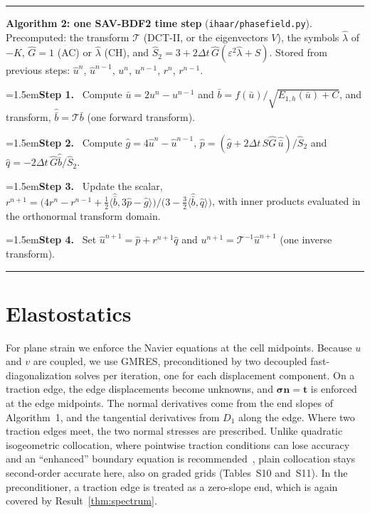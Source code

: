 \documentclass[preprint,12pt]{elsarticle}
\theoremstyle{remark}
\newcommand{\step}[1]{\par\noindent\hangindent=1.5em\hangafter=1\textbf{Step #1.}\ }
\begin{document}
\begin{algorithm}[t]\small\hrule\smallskip
\noindent\textbf{Algorithm 2: one SAV-BDF2 time step} (\texttt{ihaar/phasefield.py}).
Precomputed: the transform $\mathcal T$ (DCT-II, or the eigenvectors $V$), the symbols $\hat\lambda$ of
$-K$, $\hat G=1$ (AC) or $\hat\lambda$ (CH), and $\hat S_2=3+2\Delta t\,\hat G(\varepsilon^2\hat\lambda+S)$.
Stored from previous steps: $\hat u^n$, $\hat u^{n-1}$, $u^n$, $u^{n-1}$, $r^n$, $r^{n-1}$.
\step{1} Compute $\bar u=2u^n-u^{n-1}$ and $\bar b=f(\bar u)/\sqrt{E_{1,h}(\bar u)+C}$, and transform, $\hat{\bar b}=\mathcal T\bar b$ (one forward transform).
\step{2} Compute $\hat g=4\hat u^n-\hat u^{n-1}$, $\hat p=(\hat g+2\Delta t\,S\hat G\,\hat{\bar u})/\hat S_2$ and $\hat q=-2\Delta t\,\hat G\hat{\bar b}/\hat S_2$.
\step{3} Update the scalar, $r^{n+1}=\big(4r^n-r^{n-1}+\tfrac12\langle\hat{\bar b},3\hat p-\hat g\rangle\big)/\big(3-\tfrac32\langle\hat{\bar b},\hat q\rangle\big)$, with inner products evaluated in the orthonormal transform domain.
\step{4} Set $\hat u^{n+1}=\hat p+r^{n+1}\hat q$ and $u^{n+1}=\mathcal T^{-1}\hat u^{n+1}$ (one inverse transform).
\smallskip\hrule
\end{algorithm}

\section{Elastostatics}\label{sec:elast}
For plane strain we enforce the Navier equations at the cell midpoints. Because $u$ and $v$ are coupled,
we use GMRES, preconditioned by two decoupled fast-diagonalization solves per iteration, one for each
displacement component. On a traction edge, the edge displacements become unknowns, and
$\boldsymbol\sigma\mathbf n=\mathbf t$ is enforced at the edge midpoints. The normal derivatives come from
the end slopes of Algorithm~1, and the tangential derivatives from $D_1$ along the edge. Where two traction
edges meet, the two normal stresses are prescribed. Unlike quadratic isogeometric collocation, where
pointwise traction conditions can lose accuracy and an ``enhanced'' boundary equation is
recommended~\cite{delorenzis2015isogeometric}, plain collocation stays second-order accurate here, also on
graded grids (Tables~S10 and~S11). In the preconditioner, a traction edge is treated as a zero-slope end,
which is again covered by Result~\ref{thm:spectrum}.
\end{document}

